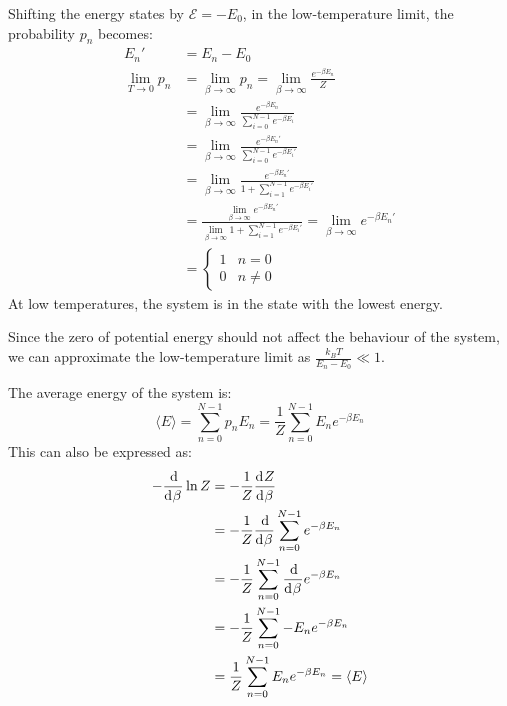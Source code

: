 \documentclass{article}
\begin{document}
Shifting the energy states by $\mathcal{E} = -E_0$, in the low-temperature limit, the probability $p_n$ becomes:
\begin{equation}
    \begin{split}
        E_n' & = E_n - E_0 \\
        \lim_{T\to 0} p_n & = \lim_{\beta\to\infty} p_n = \lim_{\beta\to\infty} \frac{ e^{-\beta E_n}}{Z} \\
        & = \lim_{\beta\to\infty} \frac{e^{-\beta E_n}}{\sum_{i=0}^{N-1} e^{-\beta E_i}} \\
        & = \lim_{\beta\to\infty} \frac{e^{-\beta E_n'}}{\sum_{i=0}^{N-1} e^{-\beta E_i'}} \\
        & = \lim_{\beta\to\infty} \frac{e^{-\beta E_n'}}{1 + \sum_{i=1}^{N-1} e^{-\beta E_i'}} \\
        & = \frac{\lim_{\beta\to\infty} e^{-\beta E_n'}}{\lim_{\beta\to\infty} 1 + \sum_{i=1}^{N-1} e^{-\beta E_i'}} = \lim_{\beta\to\infty} e^{-\beta E_n'} \\
        & = \begin{cases}
            1 & n = 0 \\
            0 & n \neq 0
        \end{cases}
    \end{split}
\end{equation}
At low temperatures, the system is in the state with the lowest energy.

\clearpage

\problem
Since the zero of potential energy should not affect the behaviour of the system, we can approximate the low-temperature limit as $\frac{k_B T}{E_n - E_0} \ll 1$.

\clearpage

\problem
The average energy of the system is:
\begin{equation}
    \langle E \rangle = \sum_{n=0}^{N-1}p_n E_n = \frac{1}{Z}\sum_{n=0}^{N-1}E_n e^{-\beta E_n}
\end{equation}
This can also be expressed as:
\begin{equation}
    \begin{split}
        -\deriv[]{}{\beta} \ln{Z} & = -\frac{1}{Z}\deriv[]{Z}{\beta} \\
        & = -\frac{1}{Z}\deriv[]{}{\beta}\sum_{n=0}^{N-1} e^{-\beta E_n} \\
        & = -\frac{1}{Z}\sum_{n=0}^{N-1} \deriv[]{}{\beta} e^{-\beta E_n} \\
        & = -\frac{1}{Z}\sum_{n=0}^{N-1} -E_n e^{-\beta E_n} \\
        & = \frac{1}{Z}\sum_{n=0}^{N-1} E_n e^{-\beta E_n} = \langle E \rangle
    \end{split}
\end{equation}
\end{document}
